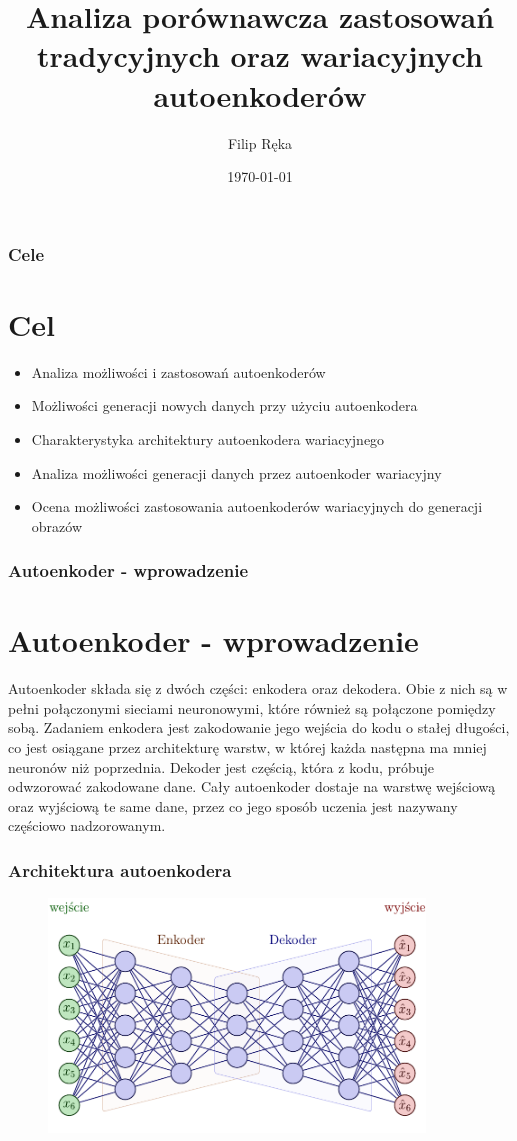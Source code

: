 \documentclass{beamer}
\title[]{Analiza porównawcza zastosowań tradycyjnych oraz wariacyjnych autoenkoderów}
\institute[UMCS]
{
	Uniwersytet Marii Curie Skłodowskiej
	\medskip
}
\author{Filip Ręka}
\date{\today}
\begin{document}
	\begin{frame}
		\titlepage
	\end{frame}

	\begin{frame}
		\tableofcontents
	\end{frame}
	\begin{frame}
		\frametitle{Cele}
		\section{Cel}
		\begin{itemize}
			\item Analiza możliwości i zastosowań autoenkoderów
			\item Możliwości generacji nowych danych przy użyciu autoenkodera
			\item Charakterystyka architektury autoenkodera wariacyjnego
			\item Analiza możliwości generacji danych przez autoenkoder wariacyjny
			\item Ocena możliwości zastosowania autoenkoderów wariacyjnych do generacji obrazów
		\end{itemize}
	\end{frame}
	\begin{frame}
		\frametitle{Autoenkoder - wprowadzenie}
		\section{Autoenkoder - wprowadzenie}
		Autoenkoder składa się z dwóch części: enkodera oraz dekodera. Obie z nich są w pełni połączonymi sieciami neuronowymi, które również są połączone pomiędzy sobą. Zadaniem enkodera jest zakodowanie jego wejścia do kodu o stałej długości, co jest osiągane przez architekturę warstw, w której każda następna ma mniej neuronów niż poprzednia. Dekoder jest częścią, która z kodu, próbuje odwzorować zakodowane dane. Cały autoenkoder dostaje na warstwę wejściową oraz wyjściową te same dane, przez co jego sposób uczenia jest nazywany częściowo nadzorowanym. 
	\end{frame}

	\begin{frame}
		\frametitle{Architektura autoenkodera}
		\begin{figure}
			\centering\includegraphics[width=10cm]{tikzae.pdf}
		\end{figure}
	\end{frame}
\end{document}
